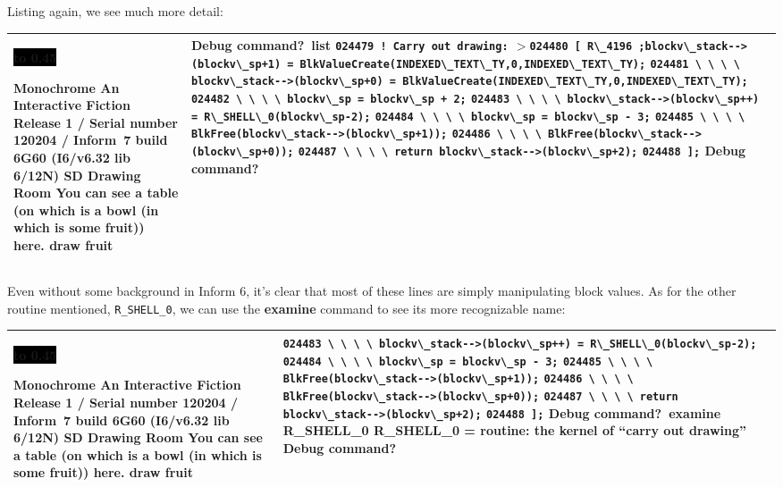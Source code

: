 \documentclass{book}
\newcommand{\n}{\hspace*{\fill}\newline}
\newcommand{\terp}[2]{\begin{center}\begin{tabular}{p{0.45\textwidth}|p{0.45\textwidth}}\midrule #1&#2\\\midrule\end{tabular}\end{center}}
\newcommand{\glkheading}[1]{\textbf{#1}}
\newcommand{\glkinput}[1]{\textbf{#1}}
\newcommand{\glkstatusline}[2]{\centerline{\colorbox{black}{\hbox to 0.45\textwidth{\textcolor{white}{#1\hfil #2}}}}}
\newcommand{\storyprompt}{\raisebox{1.5pt}{\(>\)}}
\newcommand{\cursor}{\raisebox{-1.5pt}{\RectangleThin}}
\newcommand{\markedindent}{\(>\)\qquad}
\newcommand{\unmarkedindent}{\hphantom{\(>\)}\qquad}
\newcommand{\unmarkedindentb}{\qquad\hphantom{\(>\)}}
\begin{document}
Listing again, we see much more detail:

\terp{\glkstatusline{Drawing Room}{0/1}\n
  \glkheading{Monochrome}\n
  An Interactive Fiction\n
  Release 1 / Serial number 120204 / Inform~7 build 6G60 (I6/v6.32 lib 6/12N) SD\n
  \n
  \glkheading{Drawing Room}\n
  You can see a table (on which is a bowl (in which is some fruit)) here.\n
  \n
  \storyprompt\glkinput{draw fruit}}{%
  Debug command?\ \glkinput{list}\n
  \n
  \unmarkedindent \lstinline{024479 ! Carry out drawing:}\n
  \markedindent \lstinline{024480 [ R\_4196 ;blockv\_stack-->(blockv\_sp+1) = BlkValueCreate(INDEXED\_TEXT\_TY,0,INDEXED\_TEXT\_TY);}\n
  \unmarkedindent \lstinline{024481 \ \ \ \ blockv\_stack-->(blockv\_sp+0) = BlkValueCreate(INDEXED\_TEXT\_TY,0,INDEXED\_TEXT\_TY);}\n
  \unmarkedindent \lstinline{024482 \ \ \ \ blockv\_sp = blockv\_sp + 2;}\n
  \unmarkedindent \lstinline{024483 \ \ \ \ blockv\_stack-->(blockv\_sp++) = R\_SHELL\_0(blockv\_sp-2);}\n
  \unmarkedindent \lstinline{024484 \ \ \ \ blockv\_sp = blockv\_sp - 3;}\n
  \unmarkedindent \lstinline{024485 \ \ \ \ BlkFree(blockv\_stack-->(blockv\_sp+1));}\n
  \unmarkedindent \lstinline{024486 \ \ \ \ BlkFree(blockv\_stack-->(blockv\_sp+0));}\n
  \unmarkedindent \lstinline{024487 \ \ \ \ return blockv\_stack-->(blockv\_sp+2);}\n
  \unmarkedindent \lstinline{024488 ];}\n
  \n
  Debug command?\ \cursor}

Even without some background in Inform 6, it's clear that most of these lines
are simply manipulating block values.  As for the other routine mentioned,
\lstinline{R_SHELL_0}, we can use the \glkinput{examine} command to see its more
recognizable name:

\terp{\glkstatusline{Drawing Room}{0/1}\n
  \glkheading{Monochrome}\n
  An Interactive Fiction\n
  Release 1 / Serial number 120204 / Inform~7 build 6G60 (I6/v6.32 lib 6/12N) SD\n
  \n
  \glkheading{Drawing Room}\n
  You can see a table (on which is a bowl (in which is some fruit)) here.\n
  \n
  \storyprompt\glkinput{draw fruit}}{%
  \unmarkedindentb \lstinline{024483 \ \ \ \ blockv\_stack-->(blockv\_sp++) = R\_SHELL\_0(blockv\_sp-2);}\n
  \unmarkedindent \lstinline{024484 \ \ \ \ blockv\_sp = blockv\_sp - 3;}\n
  \unmarkedindent \lstinline{024485 \ \ \ \ BlkFree(blockv\_stack-->(blockv\_sp+1));}\n
  \unmarkedindent \lstinline{024486 \ \ \ \ BlkFree(blockv\_stack-->(blockv\_sp+0));}\n
  \unmarkedindent \lstinline{024487 \ \ \ \ return blockv\_stack-->(blockv\_sp+2);}\n
  \unmarkedindent \lstinline{024488 ];}\n
  \n
  Debug command?\ \glkinput{examine R\_SHELL\_0}\n
  \n
  R\_SHELL\_0 = routine: the kernel of ``carry out drawing''\n
  \n
  Debug command?\ \cursor}
\end{document}
